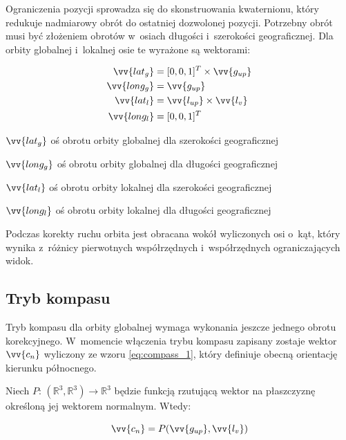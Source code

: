 Ograniczenia pozycji sprowadza się do skonstruowania kwaternionu, który redukuje nadmiarowy obrót do ostatniej dozwolonej pozycji. Potrzebny obrót musi być złożeniem obrotów w~osiach długości i~szerokości geograficznej.
Dla orbity globalnej i~lokalnej osie te wyrażone są wektorami:
\begin{samepage}
  \begin{align}
      \vv{lat_g} &= [0, 0, 1]^T \times \vv{g_{up}} \\
      \vv{long_g} &= \vv{g_{up}} \\
      \vv{lat_l} &= \vv{l_{up}} \times \vv{l_v} \\
      \vv{long_l} &= [0, 0, 1]^T
  \end{align}
  \begin{eqexpl}[25mm]
      \item {$\vv{lat_g}$} oś obrotu orbity globalnej dla szerokości geograficznej
      \item {$\vv{long_g}$} oś obrotu orbity globalnej dla długości geograficznej
      \item {$\vv{lat_l}$} oś obrotu orbity lokalnej dla szerokości geograficznej
      \item {$\vv{long_l}$} oś obrotu orbity lokalnej dla długości geograficznej
  \end{eqexpl}
  \vspace{\baselineskip}
\end{samepage}

Podczas korekty ruchu orbita jest obracana wokół wyliczonych osi o~kąt, który wynika z~różnicy pierwotnych współrzędnych i~współrzędnych ograniczających widok.

\subsection{Tryb kompasu}

Tryb kompasu dla orbity globalnej wymaga wykonania jeszcze jednego obrotu korekcyjnego. W~momencie włączenia trybu kompasu zapisany zostaje wektor $\vv{c_n}$ wyliczony ze wzoru \ref{eq:compass_1}, który definiuje obecną orientację kierunku północnego.

Niech $P:\,(\mathbb{R}^3, \mathbb{R}^3) \to \mathbb{R}^3$ będzie funkcją rzutującą wektor na płaszczyznę określoną jej wektorem normalnym. Wtedy:

\begin{samepage}
  \begin{equation}
    \label{eq:compass_1}
      \vv{c_n} = P(\vv{g_{up}}, \vv{l_v})
  \end{equation}
  \vspace{\baselineskip}
\end{samepage}



